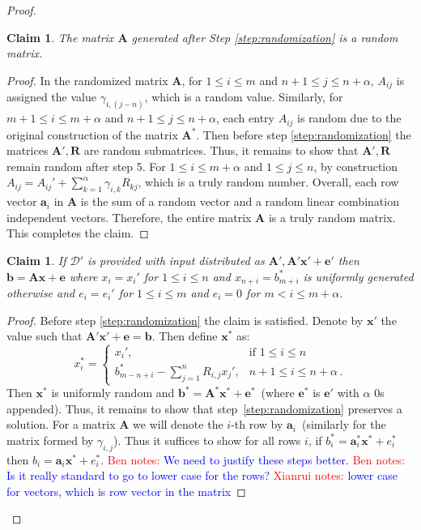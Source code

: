 \documentclass[11pt]{article}
\newcommand{\vect}[1]{\ensuremath{\textbf{#1}}}
\newcommand{\D}{\mathcal{D}}
\newtheorem{claim}[theorem]{Claim}
\newcommand{\authnote}[2]{{\textcolor{red}{\textsf{#1 notes: }\textcolor{blue}{ #2}}\marginpar{\textcolor{red}{\textbf{!!!!!}}}}}
\newcommand{\authnote}[2]{}
\newcommand{\bnote}[1]{{\authnote{Ben}{#1}}}
\newcommand{\xnote}[1]{{\authnote{Xianrui}{#1}}}
\newcommand{\ve}{\vect{e}}
\newcommand{\vA}{\vect{A}}
\newcommand{\vx}{\vect{x}}
\newcommand{\va}{\vect{a}}
\newcommand{\vb}{\vect{b}}
\begin{document}
{\begin{proof}
\begin{claim}
\label{cl:randomMatrixDist}
The matrix $\vA$ generated after Step \ref{step:randomization} is a random matrix.
\end{claim}
\begin{proof}
In the randomized matrix $\vect{A}$, for $1\le i \le m$ and $n+1\le j \le n+\alpha$, $A_{ij}$ is assigned the value $\gamma_{i,(j - n)}$, which is a random value.  Similarly, for $m+1\le i \le m+\alpha$ and $n+1\le j \le n+\alpha$, each entry $A_{ij}$ is random due to the original construction of the matrix $\vA^*$.  Then before step \ref{step:randomization} the matrices $\vA', \vect{R}$ are random submatrices.  Thus, it remains to show that $\vA', \vect{R}$ remain random after step 5. For $1\le i \le m+\alpha$ and $1\le j \le n$, by construction $A_{ij} = A_{ij}'+\sum_{k=1}^\alpha \gamma_{i, k} R_{kj}$, which is a truly random number. Overall, each row vector $\va_{i}$ in $\vA$ is the sum of a random vector and a random linear combination independent vectors. Therefore, the entire matrix $\vA$ is a truly random matrix.  This completes the claim.
\end{proof}
\begin{claim}
\label{cl:random ax+e}
If $\D'$ is provided with input distributed as $\vA', \vA'\vx'+\ve'$ then $\vb = \vA \vx+\ve$ where $x_i = x_i'$ for $1\leq i \leq n$ and $x_{n+i} = b_{m+i}^*$ is uniformly generated otherwise and  $e_i = e_i'$ for $1\leq i\leq m$ and $e_i = 0$ for $m<i\leq m+\alpha$.
\end{claim}
\begin{proof}
Before step \ref{step:randomization} the claim is satisfied.  Denote by $\vx'$ the value such that $\vA'\vx'+\ve = \vb$.  
Then define $\vx^*$ as:
\[
x^*_i = \begin{cases}
x_i', & \text{if }1\leq i\leq n \\
b_{m-n+i}^*-\sum_{j=1}^n R_{i, j} x_j', & n+1\leq i\leq n+\alpha\,.
\end{cases}
\]
Then $\vx^*$ is uniformly random and $\vb^* = \vA^*\vx^* + \ve^*$~(where $\ve^*$ is $\ve'$ with $\alpha$ 0s appended).  Thus, it remains to show that step~\ref{step:randomization} preserves a solution.
For a matrix $\vA$ we will denote the $i$-th row by $\va_i$~(similarly for the matrix formed by $\gamma_{i,j}$).  Thus it suffices to show for all rows $i$, if $b_i^* = \va^*_i \vx^*+e^*_i$  then $b_i = \va_i \vx^* + e^*_i$.
\bnote{We need to justify these steps better.}
\bnote{Is it really standard to go to lower case for the rows?}
\xnote{lower case for vectors, which is row vector in the matrix}



\end{proof}
\end{proof}}
\end{document}
